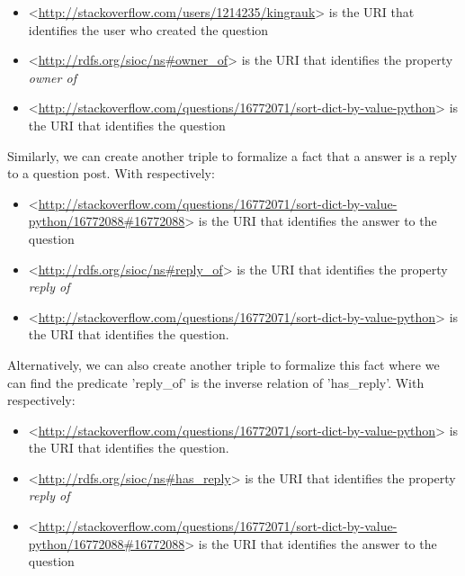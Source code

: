 

\begin{itemize}
\item{<\url{http://stackoverflow.com/users/1214235/kingrauk}> is the URI that identifies the user who created the question}
\item{<\url{http://rdfs.org/sioc/ns#owner_of}> is the URI that identifies the property \textit{owner of}}
\item{<\url{http://stackoverflow.com/questions/16772071/sort-dict-by-value-python}> is the URI that identifies the question}
\end{itemize}

Similarly, we can create another triple to formalize a fact that a answer is a reply to a question post. With respectively:

\begin{itemize}
\item{<\url{http://stackoverflow.com/questions/16772071/sort-dict-by-value-python/16772088#16772088}> is the URI that identifies the answer to the question}
\item{<\url{http://rdfs.org/sioc/ns#reply_of}> is the URI that identifies the property \textit{reply of}}
\item{<\url{http://stackoverflow.com/questions/16772071/sort-dict-by-value-python}> is the URI that identifies the question.}
\end{itemize}

Alternatively, we can also create another triple to formalize this fact where we can find the predicate 'reply\_of' is the inverse relation of 'has\_reply'. With respectively:
\begin{itemize}
\item{<\url{http://stackoverflow.com/questions/16772071/sort-dict-by-value-python}> is the URI that identifies the question.}

\item{<\url{http://rdfs.org/sioc/ns#has_reply}> is the URI that identifies the property \textit{reply of}}
\item{<\url{http://stackoverflow.com/questions/16772071/sort-dict-by-value-python/16772088#16772088}> is the URI that identifies the answer to the question}

\end{itemize}


